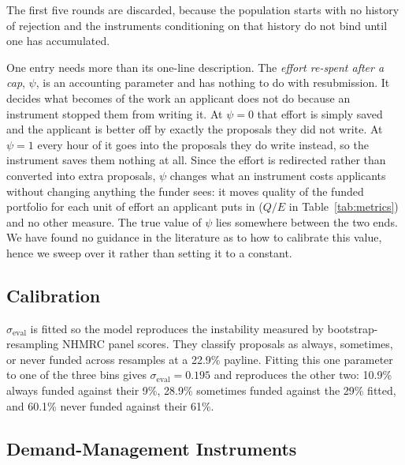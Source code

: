 \documentclass[11pt,a4paper]{article}
\begin{document}
The first five rounds are discarded, because the population starts with no
history of rejection and the instruments conditioning on that history do not bind
until one has accumulated.

One entry needs more than its one-line description. The \emph{effort re-spent
after a cap}, $\psi$, is an accounting parameter and has nothing to do with
resubmission. It decides what becomes of the work an applicant does not do because
an instrument stopped them from writing it. At $\psi=0$ that effort is simply
saved and the applicant is better off by exactly the proposals they did not write.
At $\psi=1$ every hour of it goes into the proposals they do write instead, so the
instrument saves them nothing at all. Since the effort is redirected rather than
converted into extra proposals, $\psi$ changes what an instrument costs applicants
without changing anything the funder sees: it moves quality of the funded portfolio for each unit of effort an applicant puts in ($Q/E$ in Table~\ref{tab:metrics}) and no other measure.
The true value of $\psi$ lies somewhere between the two ends. We have found no guidance in the literature as to how to calibrate this value, hence we sweep over it rather than setting it to a constant.

\subsection{Calibration}

$\sigma_{\text{eval}}$ is fitted so the model reproduces the instability
\citet{graves2011} measured by bootstrap-resampling NHMRC panel scores. They
classify proposals as always, sometimes, or never funded across resamples at a
22.9\% payline. Fitting this one parameter to one of the three bins gives
$\sigma_{\text{eval}} = 0.195$ and reproduces the other two: 10.9\% always funded
against their 9\%, 28.9\% sometimes funded against the 29\% fitted, and 60.1\%
never funded against their 61\%.

\subsection{Demand-Management Instruments}
\end{document}
